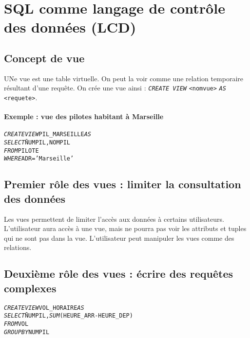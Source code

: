 \documentclass[10pt]{article}
\begin{document}
	\section{SQL comme langage de contrôle des données (LCD)}
		\subsection{Concept de vue}
			UNe vue est une table virtuelle. On peut la voir comme une relation temporaire résultant d'une requête. On crée une vue ainsi : \emph{\texttt{CREATE VIEW}} \texttt{<nomvue>} \emph{\texttt{AS}} \texttt{<requete>}.
			
			\paragraph{Exemple : vue des pilotes habitant à Marseille}
				\begin{alltt}
					\begin{tabbing}
						\emph{CREATE VIEW} PIL_MARSEILLE \emph{AS}\\
						\emph{SELECT}\= NUMPIL, NOMPIL\\
						\emph{FROM} \> PILOTE\\
						\emph{WHERE} \> ADR='Marseille'
					\end{tabbing}
				\end{alltt}
				
		\subsection{Premier rôle des vues : limiter la consultation des données}
			Les vues permettent de limiter l'accès aux données à certains utilisateurs. L'utilisateur aura accès à une vue, mais ne pourra pas voir les attributs et tuples qui ne sont pas dans la vue. L'utilisateur peut manipuler les vues comme des relations.
			
		\subsection{Deuxième rôle des vues : écrire des requêtes complexes}
			\begin{alltt}
				\begin{tabbing}
					\emph{CREATE VIEW} VOL_HORAIRE \emph{AS}\\
					\emph{SELECT}\= NUMPIL, \emph{SUM}(HEURE_ARR-HEURE_DEP)\\
					\emph{FROM}\> VOL\\
					\emph{GROUP BY} NUMPIL
				\end{tabbing}
			\end{alltt}
			
\end{document}
